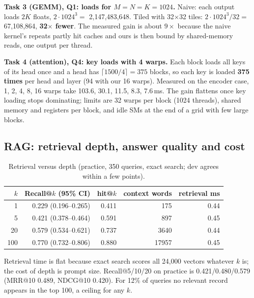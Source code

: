 \documentclass{article}
\begin{document}
\textbf{Task 3 (GEMM), Q1: loads for $M{=}N{=}K{=}1024$.} Naive: each output loads $2K$ floats, $2\cdot1024^3=$ 2{,}147{,}483{,}648. Tiled with 32$\times$32 tiles: $2\cdot1024^3/32=$ 67{,}108{,}864, \textbf{32$\times$ fewer}. The measured gain is about $9\times$ because the naive kernel's repeats partly hit caches and ours is then bound by shared-memory reads, one output per thread.

\textbf{Task 4 (attention), Q4: key loads with 4 warps.} Each block loads all keys of its head once and a head has $\lceil 1500/4\rceil=375$ blocks, so each key is loaded \textbf{375 times} per head and layer (94 with our 16 warps). Measured on the encoder case, 1, 2, 4, 8, 16 warps take 103.6, 30.1, 11.5, 8.3, 7.6\,ms. The gain flattens once key loading stops dominating; limits are 32 warps per block (1024 threads), shared memory and registers per block, and idle SMs at the end of a grid with few large blocks.

\subsection{RAG: retrieval depth, answer quality and cost}
\label{sec:rag-results}
\begin{table}[h]
\centering\small
\caption{Retrieval versus depth (practice, 350 queries, exact search; dev agrees within a few points).}
\label{tab:retrieval}
\begin{tabular}{rrrrr}
\toprule
$k$ & Recall@$k$ (95\% CI) & hit@$k$ & context words & retrieval ms\\
\midrule
1 & 0.229 (0.196--0.265) & 0.411 & 175 & 0.44\\
5 & 0.421 (0.378--0.464) & 0.591 & 897 & 0.45\\
20 & 0.579 (0.534--0.621) & 0.737 & 3640 & 0.44\\
100 & 0.770 (0.732--0.806) & 0.880 & 17957 & 0.45\\
\bottomrule
\end{tabular}
\end{table}
Retrieval time is flat because exact search scores all 24{,}000 vectors whatever $k$ is; the cost of depth is prompt size. Recall@5/10/20 on practice is 0.421/0.480/0.579 (MRR@10 0.489, NDCG@10 0.420). For 12\% of queries no relevant record appears in the top 100, a ceiling for any $k$.
\end{document}

